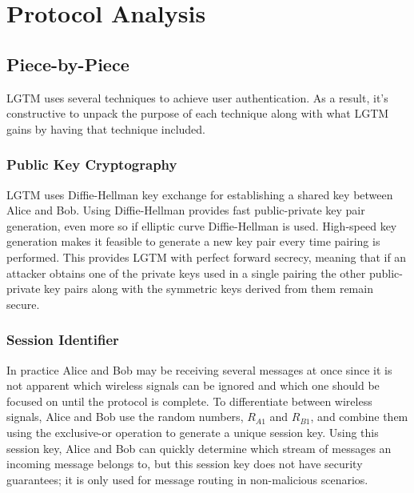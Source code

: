 \documentclass[12pt]{report}
\begin{document}
\chapter{Protocol Analysis}
\section{Piece-by-Piece}
LGTM uses several techniques to achieve user authentication. As a result, it's constructive to unpack the purpose of each technique along with what LGTM gains by having that technique included. \par

\subsection{Public Key Cryptography}
LGTM uses Diffie-Hellman key exchange \cite{DiffieHellman2006} for establishing a shared key between Alice and Bob. Using Diffie-Hellman provides fast public-private key pair generation, even more so if elliptic curve Diffie-Hellman is used. High-speed key generation makes it feasible to generate a new key pair every time pairing is performed. This provides LGTM with perfect forward secrecy, meaning that if an attacker obtains one of the private keys used in a single pairing the other public-private key pairs along with the symmetric keys derived from them remain secure. \par

\subsection{Session Identifier}
In practice Alice and Bob may be receiving several messages at once since it is not apparent which wireless signals can be ignored and which one should be focused on until the protocol is complete. To differentiate between wireless signals, Alice and Bob use the random numbers, $R_{A1}$ and $R_{B1}$, and combine them using the exclusive-or operation to generate a unique session key. Using this session key, Alice and Bob can quickly determine which stream of messages an incoming message belongs to, but this session key does not have security guarantees; it is only used for message routing in non-malicious scenarios. \par
\end{document}

